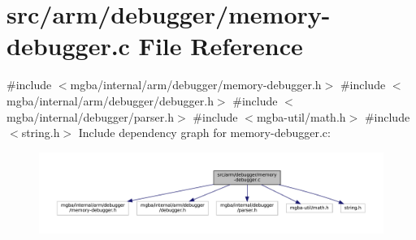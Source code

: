 \hypertarget{arm_2debugger_2memory-debugger_8c}{}\section{src/arm/debugger/memory-\/debugger.c File Reference}
\label{arm_2debugger_2memory-debugger_8c}
{\ttfamily \#include $<$mgba/internal/arm/debugger/memory-\/debugger.\+h$>$}\newline
{\ttfamily \#include $<$mgba/internal/arm/debugger/debugger.\+h$>$}\newline
{\ttfamily \#include $<$mgba/internal/debugger/parser.\+h$>$}\newline
{\ttfamily \#include $<$mgba-\/util/math.\+h$>$}\newline
{\ttfamily \#include $<$string.\+h$>$}\newline
Include dependency graph for memory-\/debugger.c\+:
\nopagebreak
\begin{figure}[H]
\begin{center}
\leavevmode
\includegraphics[width=350pt]{arm_2debugger_2memory-debugger_8c__incl}
\end{center}
\end{figure}
